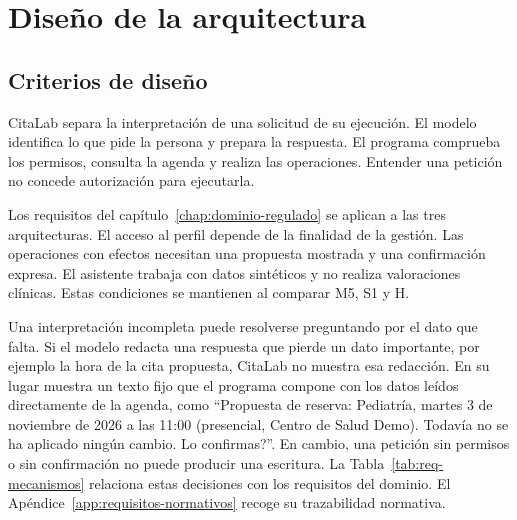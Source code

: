 \chapter{Diseño de la arquitectura}
\label{chap:diseno}

\section{Criterios de diseño}

CitaLab separa la interpretación de una solicitud de su ejecución. El modelo
identifica lo que pide la persona y prepara la respuesta. El programa comprueba
los permisos, consulta la agenda y realiza las operaciones. Entender una petición
no concede autorización para ejecutarla.

Los requisitos del capítulo~\ref{chap:dominio-regulado} se aplican a las tres
arquitecturas. El acceso al perfil depende de la finalidad de la gestión. Las
operaciones con efectos necesitan una propuesta mostrada y una confirmación
expresa. El asistente trabaja con datos sintéticos y no realiza valoraciones
clínicas. Estas condiciones se mantienen al comparar M5, S1 y H.

Una interpretación incompleta puede resolverse preguntando por el dato que falta.
Si el modelo redacta una respuesta que pierde un dato importante, por ejemplo la
hora de la cita propuesta, CitaLab no muestra esa redacción. En su lugar muestra
un texto fijo que el programa compone con los datos leídos directamente de la
agenda, como \enquote{Propuesta de reserva: Pediatría, martes 3 de noviembre de
2026 a las 11:00 (presencial, Centro de Salud Demo). Todavía no se ha aplicado
ningún cambio. \textquestiondown{}Lo confirmas?}.
En cambio, una petición sin permisos o sin confirmación no puede producir una
escritura. La Tabla~\ref{tab:req-mecanismos} relaciona estas
decisiones con los requisitos del dominio. El Apéndice~\ref{app:requisitos-normativos}
recoge su trazabilidad normativa.

